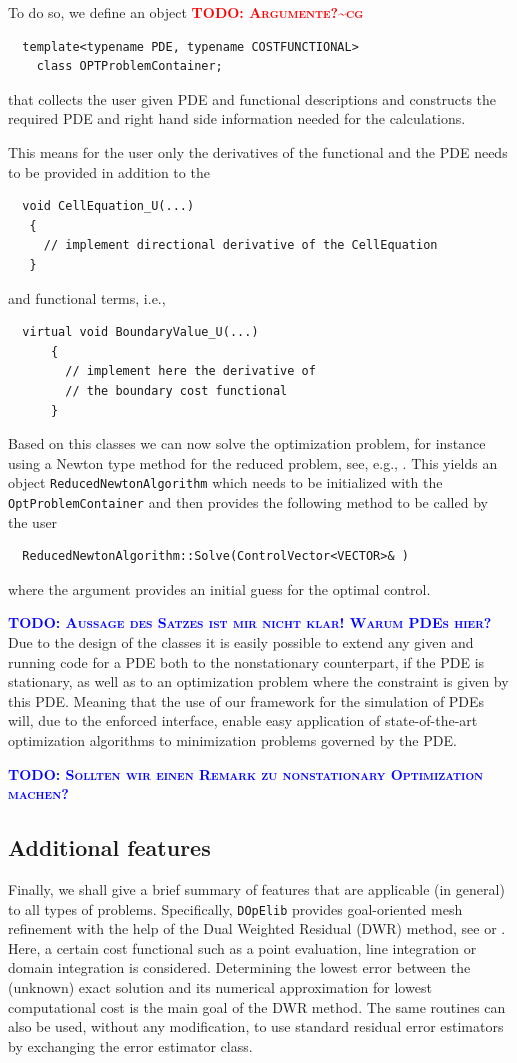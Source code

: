 \documentclass[prodmode,acmtoms]{acmsmall}
\numberwithin{equation}{section}
\newcommand{\dope}{\texttt{DOpElib}}
\newcommand{\todo}[1]{\textbf{\textsc{\textcolor{blue}{TODO: #1}}}}
\newcommand{\todocg}[1]{\textbf{\textsc{\textcolor{red}{TODO: #1\textasciitilde cg}}}}
\begin{document}
To do so, we define an object \todocg{Argumente?}
\begin{lstlisting} 
  template<typename PDE, typename COSTFUNCTIONAL>
    class OPTProblemContainer;
\end{lstlisting}
that collects the user given PDE and functional descriptions and constructs the 
required PDE and right hand side information needed for the calculations.

This means for the user only the derivatives of the functional and the PDE 
needs to be provided in addition to the 
\begin{lstlisting} 
  void CellEquation_U(...)
   {
     // implement directional derivative of the CellEquation
   }
\end{lstlisting}
and functional terms, i.e.,     
\begin{lstlisting} 
  virtual void BoundaryValue_U(...)
      {
        // implement here the derivative of 
        // the boundary cost functional
      }
\end{lstlisting}

Based on this classes we can now solve the optimization problem, for instance using 
a Newton type method for the reduced problem, see, e.g., \cite{NoWr00}. This yields 
an object \texttt{ReducedNewtonAlgorithm} which needs to be initialized 
with the \texttt{OptProblemContainer} and then provides 
the following method to be called by the user
\begin{lstlisting}
  ReducedNewtonAlgorithm::Solve(ControlVector<VECTOR>& )
\end{lstlisting}
where the argument provides an initial guess for the optimal control.

\todo{Aussage des Satzes ist mir nicht klar! Warum PDEs hier?}
Due to the design of the classes it is easily possible to extend any given 
and running code for a PDE both to the nonstationary counterpart, if the PDE is 
stationary, as well as to an optimization problem where the constraint is 
given by this PDE. Meaning that the use of our framework for the simulation of 
PDEs will, due to the enforced interface, enable easy application of state-of-the-art 
optimization algorithms to minimization problems governed by the PDE.

\todo{Sollten wir einen Remark zu nonstationary Optimization machen?}


\subsection{Additional features}
Finally, we shall give a brief summary of features 
that are applicable (in general) to all types of problems. Specifically,
\dope{} provides goal-oriented mesh refinement with the help of the 
Dual Weighted Residual (DWR) method, see \cite{BeRa96} or \cite{BR03}. Here, a certain 
cost functional such as a point evaluation, line integration or domain
integration is considered. Determining the lowest error between the 
(unknown) exact solution and its numerical approximation for lowest computational
cost is the main goal of the DWR method. The same routines 
can also be used, without any modification, to use standard residual error estimators by exchanging the 
error estimator class.
\end{document}
